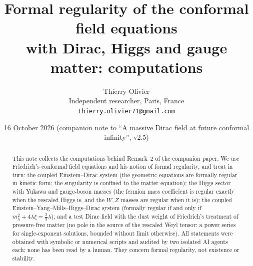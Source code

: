 \documentclass[11pt,a4paper]{article}
\title{\textbf{Formal regularity of the conformal field equations\\ with Dirac, Higgs and gauge matter: computations}}
\author{Thierry Olivier\\ \small Independent researcher, Paris, France\\ \small \texttt{thierry.olivier71@gmail.com}}
\date{16 October 2026 \quad (companion note to ``A massive Dirac field at future conformal infinity'', v2.5)}
\begin{document}
\maketitle

\begin{abstract}
This note collects the computations behind Remark~2 of the companion paper. We use Friedrich's conformal field equations \cite{Friedrich2015} and his notion of formal regularity, and treat in turn: the coupled Einstein--Dirac system (the geometric equations are formally regular in kinetic form; the singularity is confined to the matter equation); the Higgs sector with Yukawa and gauge-boson masses (the fermion mass coefficient is regular exactly when the rescaled Higgs is, and the $W,Z$ masses are regular when it is); the coupled Einstein--Yang--Mills--Higgs--Dirac system (formally regular if and only if $m_{h}^{2}+4\lambda\xi=\tfrac23\lambda$); and a test Dirac field with the dust weight of Friedrich's treatment of pressure-free matter \cite{Friedrich2017} (no pole in the source of the rescaled Weyl tensor; a power series for single-exponent solutions, bounded without limit otherwise). All statements were obtained with symbolic or numerical scripts and audited by two isolated AI agents each; none has been read by a human. They concern formal regularity, not existence or stability.
\end{abstract}
\end{document}
